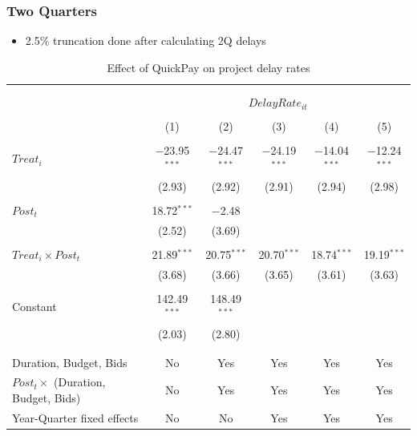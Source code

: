 \documentclass[
]{article}
\providecommand{\tightlist}{%
  \setlength{\itemsep}{0pt}\setlength{\parskip}{0pt}}
\begin{document}
\hypertarget{two-quarters-5}{%
\subsubsection{Two Quarters}\label{two-quarters-5}}

\begin{itemize}
\tightlist
\item
  2.5\% truncation done after calculating 2Q delays
\end{itemize}

\begin{table}[H] \centering 
  \caption{Effect of QuickPay on project delay rates} 
  \label{} 
\small 
\begin{tabular}{@{\extracolsep{-2pt}}lccccc} 
\\[-1.8ex]\hline 
\hline \\[-1.8ex] 
\\[-1.8ex] & \multicolumn{5}{c}{$DelayRate_{it}$} \\ 
\\[-1.8ex] & (1) & (2) & (3) & (4) & (5)\\ 
\hline \\[-1.8ex] 
 $Treat_i$ & $-$23.95$^{***}$ & $-$24.47$^{***}$ & $-$24.19$^{***}$ & $-$14.04$^{***}$ & $-$12.24$^{***}$ \\ 
  & (2.93) & (2.92) & (2.91) & (2.94) & (2.98) \\ 
  & & & & & \\ 
 $Post_t$ & 18.72$^{***}$ & $-$2.48 &  &  &  \\ 
  & (2.52) & (3.69) &  &  &  \\ 
  & & & & & \\ 
 $Treat_i \times Post_t$ & 21.89$^{***}$ & 20.75$^{***}$ & 20.70$^{***}$ & 18.74$^{***}$ & 19.19$^{***}$ \\ 
  & (3.68) & (3.66) & (3.65) & (3.61) & (3.63) \\ 
  & & & & & \\ 
 Constant & 142.49$^{***}$ & 148.49$^{***}$ &  &  &  \\ 
  & (2.03) & (2.80) &  &  &  \\ 
  & & & & & \\ 
\hline \\[-1.8ex] 
Duration, Budget, Bids & No & Yes & Yes & Yes & Yes \\ 
$Post_t \times$  (Duration, Budget, Bids) & No & Yes & Yes & Yes & Yes \\ 
Year-Quarter fixed effects & No & No & Yes & Yes & Yes \\ 

\end{tabular}
\end{table}
\end{document}
